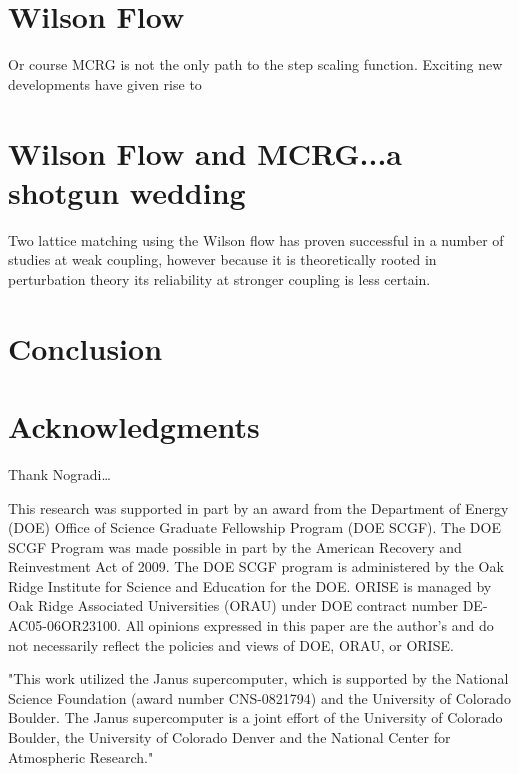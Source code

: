 \documentclass{PoS}
\begin{document}
\section{Wilson Flow}
Or course MCRG is not the only path to the step scaling function.  Exciting new developments have given rise to 

\section{Wilson Flow and MCRG...a shotgun wedding}
Two lattice matching using the Wilson flow has proven successful in a number of studies at weak coupling, however because it is theoretically rooted in perturbation theory its reliability at stronger coupling is less certain.


\section{Conclusion}

\section{Acknowledgments}
Thank Nogradi\dots

This research was supported in part by an award from the Department of Energy (DOE) Office of Science Graduate Fellowship Program (DOE SCGF).
The DOE SCGF Program was made possible in part by the American Recovery and Reinvestment Act of 2009.
The DOE SCGF program is administered by the Oak Ridge Institute for Science and Education for the DOE.
ORISE is managed by Oak Ridge Associated Universities (ORAU) under DOE contract number DE-AC05-06OR23100.
All opinions expressed in this paper are the author's and do not necessarily reflect the policies and views of DOE, ORAU, or ORISE.

"This work utilized the Janus supercomputer, which is supported by the National Science Foundation (award number CNS-0821794) and the University of Colorado Boulder.
The Janus supercomputer is a joint effort of the University of Colorado Boulder, the University of Colorado Denver and the National Center for Atmospheric Research."
\end{document}
